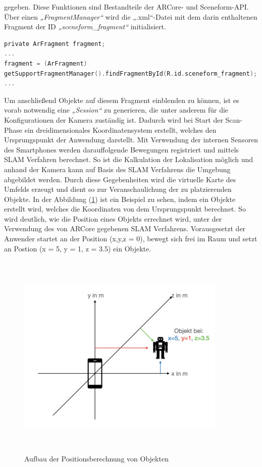 gegeben. Diese Funktionen sind Bestandteile der ARCore- und Sceneform-\acs{API}. Über einen \textit{„FragmentManager“} wird die „.xml“-Datei mit dem darin 
enthaltenen Fragment der ID \textit{„sceneform\_fragment“} initialisiert.
\\
\begin{lstlisting}[language=C,
    frame=lines,           % Ein Rahmen um den Code (single for box, lines for top and bottom)
    xleftmargin=\parindent,  % Rahmen link von den Zahlen
    style=algoBericht,
    label={code:arfragment},
    captionpos=b,           % Caption unter den Code setzen
caption={Initialisierung des Fragments}]
private ArFragment fragment;
...
fragment = (ArFragment)
getSupportFragmentManager().findFragmentById(R.id.sceneform_fragment);
...
\end{lstlisting}
Um anschließend Objekte auf diesem Fragment einblenden zu können, ist es vorab notwendig eine \textit{„Session“} zu generieren, die unter anderem für die 
Konfigurationen der Kamera zuständig ist. Dadurch wird bei Start der Scan-Phase ein dreidimensionales Koordinatensystem erstellt, welches den Ursprungspunkt der 
Anwendung darstellt. Mit Verwendung der internen Sensoren des Smartphones werden darauffolgende Bewegungen registriert und mittels \acs{SLAM} Verfahren berechnet. 
So ist die Kalkulation der Lokalisation möglich und anhand der Kamera kann auf Basis des \acs{SLAM} Verfahrens die Umgebung abgebildet werden. Durch diese 
Gegebenheiten wird die virtuelle Karte des Umfelds erzeugt und dient so zur Veranschaulichung der zu platzierenden Objekte. In der Abbildung (\ref{pic:koordin}) 
ist ein Beispiel zu sehen, indem ein Objekte erstellt wird, welches die Koordinaten von dem Ursprungspunkt berechnet. So wird deutlich, wie die Position eines 
Objekts errechnet wird, unter der Verwendung des von ARCore gegebenen \acs{SLAM} Verfahrens. Vorausgesetzt der Anwender startet an der Position (x,y,z = 0), 
bewegt sich frei im Raum und setzt an Postion (x = 5, y = 1, z = 3.5) ein Objekte.
\begin{figure}[hbt!]
    \centering
    \includegraphics[width=10cm,height=10cm,keepaspectratio]{4Umsetzung/Bilder/koordin.jpeg}
    \caption{Aufbau der Positionsberechnung von Objekten}
    \label{pic:koordin}
\end{figure}
